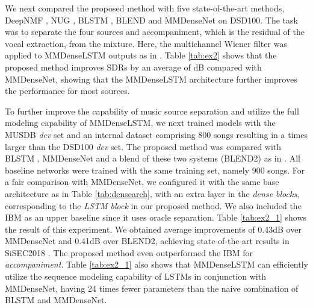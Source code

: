 \documentclass{article}
\begin{document}
\begin{table}[t]
\caption{\label{tab:ex2_1} {\it Comparison of SDR on MUSDB18 dataset.}}
\vspace{2mm}
\end{table} 
We next compared the proposed method with five state-of-the-art methods, DeepNMF \cite{Roux15}, NUG \cite{Nugraha15}, BLSTM \cite{Uhlich17}, BLEND \cite{Uhlich17} and MMDenseNet \cite{Takahashi17MMDense} on DSD100. The task was to separate the four sources and accompaniment, which is the residual of the vocal extraction, from the mixture. Here, the multichannel Wiener filter was applied to MMDenseLSTM outputs as in \cite{Uhlich17,Takahashi17MMDense}.
Table \ref{tab:ex2} shows that the proposed method improves SDRs by an average of dB compared with MMDenseNet, showing that the MMDenseLSTM architecture further improves the performance for most sources.


To further improve the capability of music source separation and utilize the full modeling capability of MMDenseLSTM, we next trained models with the MUSDB {\it dev} set and an internal dataset comprising 800 songs resulting in a  times larger than the DSD100 {\it dev} set.
The proposed method was compared with BLSTM \cite{Uhlich17}, MMDenseNet \cite{Takahashi17MMDense} and a blend of these two systems (BLEND2) as in \cite{Uhlich17}. All baseline networks were trained with the same training set, namely 900 songs. For a fair comparison with MMDenseNet, we configured it with the same base architecture as in Table \ref{tab:densearch}, with an extra layer in the {\it dense blocks}, corresponding to the {\it LSTM block} in our proposed method. 
We also included the IBM as an upper baseline since it uses oracle separation.
Table \ref{tab:ex2_1} 
shows the result of this experiment. We obtained average improvements of 0.43dB over MMDenseNet and 0.41dB over BLEND2, achieving state-of-the-art results in SiSEC2018 \cite{sisec2018}. The proposed method even outperformed the IBM for {\it accompaniment}. Table \ref{tab:ex2_1} also shows that MMDenseLSTM can efficiently utilize the sequence modeling capability of LSTMs in conjunction with MMDenseNet, having 24 times fewer parameters than the naive combination of BLSTM and MMDenseNet.
\end{document}

